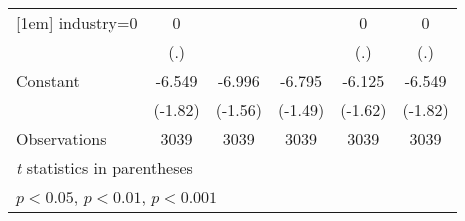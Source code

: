 \begin{table}[htbp]
\begin{tabular}{l*{5}{c}}
[1em]
industry=0          &           0         &                     &                     &           0         &           0         \\
                    &         (.)         &                     &                     &         (.)         &         (.)         \\
[1em]
Constant            &      -6.549         &      -6.996         &      -6.795         &      -6.125         &      -6.549         \\
                    &     (-1.82)         &     (-1.56)         &     (-1.49)         &     (-1.62)         &     (-1.82)         \\
\hline
Observations        &        3039         &        3039         &        3039         &        3039         &        3039         \\
\hline\hline
\multicolumn{6}{l}{\footnotesize \textit{t} statistics in parentheses}\\
\multicolumn{6}{l}{\footnotesize \sym{*} \(p<0.05\), \sym{**} \(p<0.01\), \sym{***} \(p<0.001\)}\\
\end{tabular}
\end{table}
